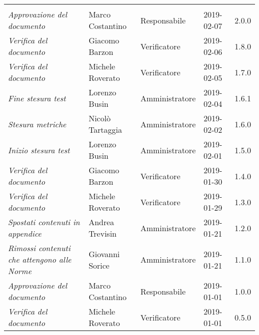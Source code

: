 \newpage 
\section*{}
	\begin{longtable}{p{4cm}|C{3cm}|C{3cm}|R{2.5cm}|R{2cm}}
	
	 & & & & \\
	\endhead
	
		\emph{Approvazione del documento} & Marco Costantino & Responsabile & 2019-02-07 & 2.0.0 \\
		\hline
	
		\emph{Verifica del documento} & Giacomo Barzon & Verificatore & 2019-02-06 & 1.8.0 \\
		\hline
		
		\emph{Verifica del documento} & Michele Roverato & Verificatore & 2019-02-05 & 1.7.0 \\
		\hline
	
		\emph{Fine stesura test} & Lorenzo Busin & Amministratore & 2019-02-04 & 1.6.1 \\
		\hline
		
		\emph{Stesura metriche} & Nicolò Tartaggia & Amministratore & 2019-02-02 & 1.6.0 \\
		\hline
	
		\emph{Inizio stesura test} & Lorenzo Busin & Amministratore & 2019-02-01 & 1.5.0 \\
		\hline
	
		\emph{Verifica del documento} & Giacomo Barzon & Verificatore & 2019-01-30 & 1.4.0 \\
		\hline
		
		\emph{Verifica del documento} & Michele Roverato & Verificatore & 2019-01-29 & 1.3.0 \\
		\hline
		
		\emph{Spostati contenuti in appendice} & Andrea Trevisin & Amministratore & 2019-01-21 & 1.2.0 \\
		\hline
	
		\emph{Rimossi contenuti che attengono alle Norme} & Giovanni Sorice & Amministratore & 2019-01-21 & 1.1.0 \\
		\hline
		
		\emph{Approvazione del documento} & Marco Costantino & Responsabile & 2019-01-01 & 1.0.0 \\
		\hline
		
		\emph{Verifica del documento} & Michele Roverato & Verificatore & 2019-01-01 & 0.5.0 \\
		\hline
		

\end{longtable}
